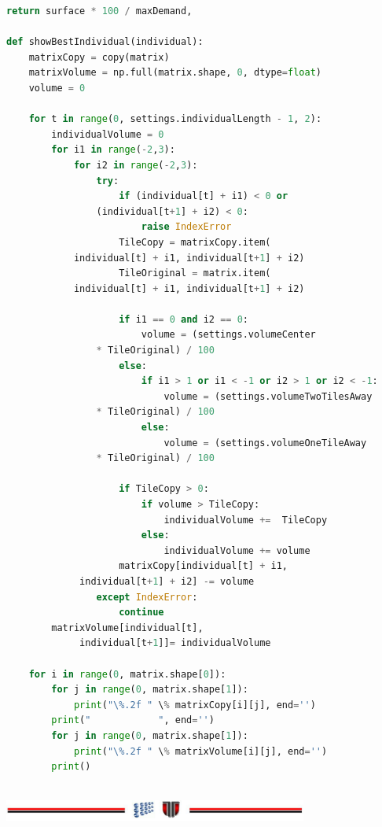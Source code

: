 \documentclass[a4paper,12pt]{report}
\begin{document}
\begin{lstlisting}[language=Python]
    return surface * 100 / maxDemand,

def showBestIndividual(individual):
    matrixCopy = copy(matrix)
    matrixVolume = np.full(matrix.shape, 0, dtype=float)
    volume = 0
    
    for t in range(0, settings.individualLength - 1, 2):
        individualVolume = 0
        for i1 in range(-2,3):
            for i2 in range(-2,3):
                try:
                    if (individual[t] + i1) < 0 or 
				(individual[t+1] + i2) < 0:
                        raise IndexError
                    TileCopy = matrixCopy.item(
			individual[t] + i1, individual[t+1] + i2)
                    TileOriginal = matrix.item(
			individual[t] + i1, individual[t+1] + i2)
                        
                    if i1 == 0 and i2 == 0:
                        volume = (settings.volumeCenter 
				* TileOriginal) / 100
                    else:
                        if i1 > 1 or i1 < -1 or i2 > 1 or i2 < -1:
                            volume = (settings.volumeTwoTilesAway 
				* TileOriginal) / 100
                        else:
                            volume = (settings.volumeOneTileAway 
				* TileOriginal) / 100
                        
                    if TileCopy > 0:       
                        if volume > TileCopy:
                            individualVolume +=  TileCopy
                        else:
                            individualVolume += volume
                    matrixCopy[individual[t] + i1,
			 individual[t+1] + i2] -= volume
                except IndexError:
                    continue 
        matrixVolume[individual[t],
			 individual[t+1]]= individualVolume
    
    for i in range(0, matrix.shape[0]):
        for j in range(0, matrix.shape[1]):
            print("\%.2f " \% matrixCopy[i][j], end='')
        print("            ", end='')
        for j in range(0, matrix.shape[1]):
            print("\%.2f " \% matrixVolume[i][j], end='')
        print()
       
\end{lstlisting}





\vspace{2cm}
\begin{center}
\includegraphics[width=10cm]{fig/footer}
\end{center}
\end{document}
